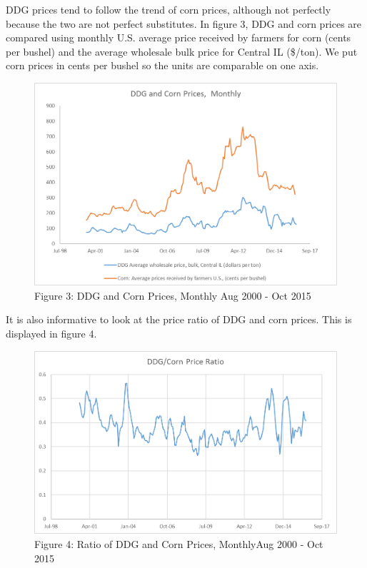 \documentclass[]{book}
\theoremstyle{definition}
\theoremstyle{definition}
\theoremstyle{remark}
\begin{document}
DDG prices tend to follow the trend of corn prices, although not
perfectly because the two are not perfect substitutes. In figure 3, DDG
and corn prices are compared using monthly U.S. average price received
by farmers for corn (cents per bushel) and the average wholesale bulk
price for Central IL (\$/ton). We put corn prices in cents per bushel so
the units are comparable on one axis.

\begin{figure}[htbp]
\centering
\includegraphics{Excel-files/EthanolMarketsand-Ethanol_files/image001.png}
\caption{Figure 3: DDG and Corn Prices, Monthly Aug 2000 - Oct 2015}
\end{figure}

It is also informative to look at the price ratio of DDG and corn
prices. This is displayed in figure 4.

\begin{figure}[htbp]
\centering
\includegraphics{Excel-files/EthanolMarketsand-Ethanol_files/image003.png}
\caption{Figure 4: Ratio of DDG and Corn Prices, MonthlyAug 2000 - Oct
2015}
\end{figure}
\end{document}
